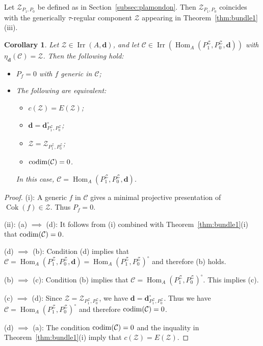 \documentclass[12pt,reqno]{amsart}
\newtheorem{Cor}[Thm]{Corollary}
\theoremstyle{definition}
\newcommand{\cC}{{\mathcal C}}
\newcommand{\bd}{\mathbf{d}}
\newcommand{\Hom}{\operatorname{Hom}}
\newcommand{\Coker}{\operatorname{Cok}}
\newcommand{\irr}{\operatorname{Irr}}
\newcommand{\calZ}{\mathcal{Z}}
\begin{document}
Let $\calZ_{P_1,P_0}$ be defined as in
Section~\ref{subsec:plamondon}.
Then $\calZ_{P_1,P_0}$ coincides with the
generically $\tau$-regular component $\calZ$ appearing
in Theorem~\ref{thm:bundle1}(iii).


\begin{Cor}\label{cor:bundle2}
Let $\calZ \in \irr(A,\bd)$, and let
$\cC \in \irr(\Hom_A(P_1^{\calZ},P_0^{\calZ},\bd))$
with $\eta_\bd(\cC) = \calZ$.
Then the following hold:
\begin{itemize}\itemsep2mm

\item[(i)]
$P_f = 0$ with $f$ generic in $\cC$;

\item[(ii)]
The following are equivalent:
\begin{itemize}%

\item[(a)]
$c(\calZ) = E(\calZ)$;

\item[(b)]
$\bd = \bd_{P_1^{\calZ},P_0^{\calZ}}^\circ$;

\item[(c)]
$\calZ = \calZ_{P_1^{\calZ},P_0^{\calZ}}$;

\item[(d)]
${\rm codim}(\cC) = 0$.

\end{itemize}
In this case, $\cC = \Hom_A(P_1^{\calZ},P_0^{\calZ},\bd)$.

\end{itemize}
\end{Cor}


\begin{proof}
(i):
A generic $f$ in $\cC$ gives a minimal projective presentation
of $\Coker(f) \in \calZ$.
Thus $P_f = 0$.

(ii):
(a) $\implies$ (d):
It follows from (i) combined with Theorem~\ref{thm:bundle1}(i)
that ${\rm codim}(\cC) = 0$.

(d) $\implies$ (b):
Condition (d) implies that
$\cC = \Hom_A(P_1^\calZ,P_0^\calZ,\bd) = \Hom_A(P_1^\calZ,P_0^\calZ)^\circ$ and therefore
(b) holds.

(b) $\implies$ (c):
Condition (b) implies that
$\cC = \Hom_A(P_1^\calZ,P_0^\calZ)^\circ$.
This implies (c).

(c) $\implies$ (d):
Since
$\calZ = \calZ_{P_1^\calZ,P_0^\calZ}$, we have $\bd = \bd_{P_1^\calZ,P_0^\calZ}^\circ$.
Thus we have $\cC = \Hom_A(P_1^\calZ,P_0^\calZ)^\circ$ and therefore ${\rm codim}(\cC) = 0$.

(d) $\implies$ (a):
The condition ${\rm codim}(\cC) = 0$ and the inquality in
Theorem~\ref{thm:bundle1}(i) imply that $c(\calZ) = E(\calZ)$.
\end{proof}
\end{document}

